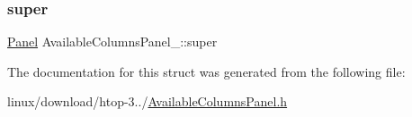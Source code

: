 \subsubsection{\texorpdfstring{super}{super}}
{\footnotesize\ttfamily \hyperlink{Panel_8h_a034d4c16521db412dc7a1e8536d16fae}{Panel} Available\+Columns\+Panel\+\_\+\+::super}



The documentation for this struct was generated from the following file\+:\begin{DoxyCompactItemize}
\item 
linux/download/htop-\/3../\hyperlink{AvailableColumnsPanel_8h}{Available\+Columns\+Panel.\+h}\end{DoxyCompactItemize}
